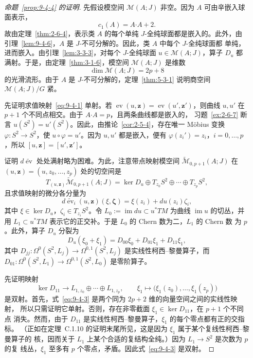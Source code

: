 \begin{proof}[命题~\ref{prop:9-4-4} 的证明]
先假设模空间 $\mathcal M(A;J)$ 非空。因为 $A$ 可由辛嵌入球面表示，
\[
  c_1(A)=A\mathbin{\boldsymbol\cdot}A+2.
\]
故由定理~\ref{thm:2-6-4}，表示类 $A$ 的每个单纯 $J$-全纯球面都是嵌入的。此外，由
引理~\ref{lem:9-4-6}，$A$ 是 $J$-不可分解的。因此，类 $A$ 中每个 $J$-全纯球面都
单纯，进而嵌入。由引理~\ref{lem:3-3-3}，对每个 $J$-全纯球面
$u\in\mathcal M(A;J)$，算子 $D_u$ 都满射。于是，由定理~\ref{thm:3-1-6}，模空间
$\mathcal M(A;J)$ 是维数
\[
  \dim\mathcal M(A;J)=2p+8
\]
的光滑流形。由于 $A$ 是 $J$-不可分解的，定理~\ref{thm:5-3-1} 说明商空间
$\mathcal M(A;J)/G$ 紧。

先证明求值映射~\eqref{eq:9-4-1} 单射。若
$\operatorname{ev}(u,\mathbf z)=\operatorname{ev}(u',\mathbf z')$，则曲线 $u,u'$ 在
$p+1$ 个不同点相交。由于 $A\mathbin{\boldsymbol\cdot}A=p$，且两条曲线都是嵌入的，
习题~\ref{ex:2-6-7} 断言 $u(S^2)=u'(S^2)$。因此，由推论~\ref{cor:2-5-4}，存在唯一
Möbius 变换
$\varphi:S^2\to S^2$，使 $u\circ\varphi=u'$。因为 $u,u'$ 都是嵌入，便有
$\varphi(z_i')=z_i$，$i=0,\ldots,p$，所以
$[u,\mathbf z]=[u',\mathbf z']$。

证明 $d\widetilde{\operatorname{ev}}$ 处处满射略为困难。为此，注意带点映射模空间
$\widetilde{\mathcal M}_{0,p+1}(A;J)$ 在
$(u,\mathbf z)=(u,z_0,\ldots,z_p)$ 处的切空间是
\[
  T_{(u,\mathbf z)}\widetilde{\mathcal M}_{0,p+1}(A;J)
  =\ker D_u\oplus T_{z_0}S^2\oplus\cdots\oplus T_{z_p}S^2,
\]
且求值映射的微分各分量为
\[
  d\widetilde{\operatorname{ev}}_i(u,\mathbf z)(\xi,\boldsymbol\zeta)
  =\xi(z_i)+du(z_i)\zeta_i,
\]
其中 $\xi\in\ker D_u$，$\zeta_i\in T_{z_i}S^2$。令
$L_0:=\operatorname{im}du\subset u^*TM$ 为曲线 $\operatorname{im}u$ 的切丛，并用
$L_1\subset u^*TM$ 表示它的正交补。于是 $L_0$ 的 Chern 数为二，$L_1$ 的 Chern 数
为 $p$。此外，算子 $D_u$ 分裂为
\[
  D_u(\xi_0+\xi_1)=D_{00}\xi_0+D_{01}\xi_1+D_{11}\xi_1,
\]
其中
$D_{jj}:\Omega^0(S^2,L_j)\to\Omega^{0,1}(S^2,L_j)$ 是实线性柯西--黎曼算子，而
$D_{01}:\Omega^0(S^2,L_1)\to\Omega^{0,1}(S^2,L_0)$ 是零阶算子。

先证明映射
\begin{equation}\label{eq:9-4-3}
  \ker D_{11}\longrightarrow
  L_{1,z_0}\oplus\cdots\oplus L_{1,z_p},
  \qquad
  \xi_1\longmapsto\bigl(\xi_1(z_0),\ldots,\xi_1(z_p)\bigr)
\end{equation}
是双射。首先，式~\eqref{eq:9-4-3} 是两个同为 $2p+2$ 维的向量空间之间的实线性映射，
所以只需证明它单射。否则，存在非零截面 $\xi_1\in\ker D_{11}$，在 $p+1$ 个不同点
消失。然而，由于 $D_{11}$ 是实线性柯西--黎曼算子，$\xi_1$ 的每个零点都有正的交指标。
（正如在定理~C.1.10 的证明末尾所见，这是因为 $\xi_1$ 属于某个复线性柯西--黎曼算子的
核，因而关于 $L_1$ 上某个合适的复结构全纯。）因为 $L_1\to S^2$ 是次数为 $p$ 的复
线丛，$\xi_1$ 至多有 $p$ 个零点，矛盾。因此式~\eqref{eq:9-4-3} 是双射。


\end{proof}
